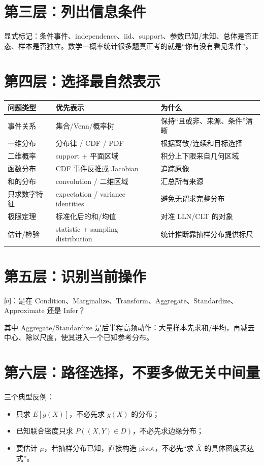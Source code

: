 \documentclass[11pt,a4paper,openany]{ctexbook}
\begin{document}
\section{第三层：列出信息条件}
显式标记：条件事件、independence、iid、support、参数已知/未知、总体是否正态、样本是否独立。数学一概率统计很多题真正考的就是“你有没有看见条件”。

\section{第四层：选择最自然表示}
\begin{longtable}{L{3.3cm}L{4.7cm}L{\dimexpr\linewidth-8.97cm\relax}}
\toprule
\textbf{问题类型} & \textbf{优先表示} & \textbf{为什么}\\
\midrule
事件关系 & 集合/Venn/概率树 & 保持“且或非、来源、条件”清晰\\
一维分布 & 分布律 / CDF / PDF & 根据离散/连续和目标选择\\
二维概率 & support + 平面区域 & 积分上下限来自几何区域\\
函数分布 & CDF 事件反推或 Jacobian & 追踪原像\\
和的分布 & convolution / 二维区域 & 汇总所有来源\\
只求数字特征 & expectation / variance identities & 避免无谓求完整分布\\
极限定理 & 标准化后的和/均值 & 对准 LLN/CLT 的对象\\
估计/检验 & statistic + sampling distribution & 统计推断靠抽样分布提供标尺\\
\bottomrule
\end{longtable}

\section{第五层：识别当前操作}
问：是在 Condition、Marginalize、Transform、Aggregate、Standardize、Approximate 还是 Infer？

其中 Aggregate/Standardize 是后半程高频动作：大量样本先求和/平均，再减去中心、除以尺度，使其进入一个已知参考分布。

\section{第六层：路径选择，不要多做无关中间量}
三个典型反例：
\begin{itemize}
  \item 只求 $E[g(X)]$，不必先求 $g(X)$ 的分布；
  \item 已知联合密度只求 $P((X,Y)\in D)$，不必先求边缘分布；
  \item 要估计 $\mu$，若抽样分布已知，直接构造 pivot，不必先“求 $\bar X$ 的具体密度表达式”。
\end{itemize}
\end{document}
